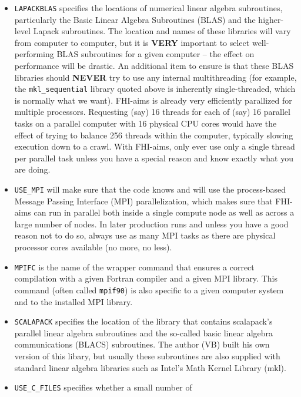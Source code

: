 \begin{itemize}
  \item \texttt{LAPACKBLAS} specifies the locations of numerical
    linear algebra subroutines, particularly the Basic Linear Algebra
    Subroutines (BLAS) and the higher-level Lapack
    subroutines. The location and names of these libraries will vary
    from computer to computer, but it is \textbf{VERY} important to
    select well-performing BLAS subroutines for a given computer --
    the effect on performance will be drastic. An additional item to
    ensure is that these BLAS libraries should \textbf{NEVER} try to
    use any internal multithreading (for example, the
    \texttt{mkl\_sequential} library quoted above is inherently
    single-threaded, which is normally what we want).
    FHI-aims is already very efficiently parallized
    for multiple processors. Requesting (say) 16 threads for each of
    (say) 16 parallel tasks on a parallel computer with 16 physical
    CPU cores would have the effect of trying to balance 256 threads
    within the computer, typically slowing execution down to a
    crawl. With FHI-aims, only ever use only a single thread per
    parallel task unless you have a special reason and know exactly
    what you are doing.  
  \item \texttt{USE\_MPI} will make sure that the code knows and will use
    the process-based Message Passing Interface (MPI) parallelization,
    which makes sure that FHI-aims can run in parallel both inside a
    single compute node as well as across a large number of
    nodes. In later production runs and unless you have a good reason
    not to do so, always use as many MPI tasks as there are physical
    processor cores available (no more, no less).
  \item \texttt{MPIFC} is the name of the wrapper command that ensures a
    correct compilation with a given Fortran compiler and a given MPI
    library. This command (often called \texttt{mpif90}) is also
    specific to a given computer system and to the installed MPI
    library.
  \item \texttt{SCALAPACK} specifies the location of the library that
    contains scalapack's parallel linear algebra subroutines and the
    so-called basic linear algebra communications (BLACS)
    subroutines. The author (VB) built his own version of this libary,
    but usually these subroutines are also supplied with standard
    linear algebra libraries such as Intel's Math Kernel Library
    (mkl).
  \item \texttt{USE\_C\_FILES} specifies whether a small number of

\end{itemize}
